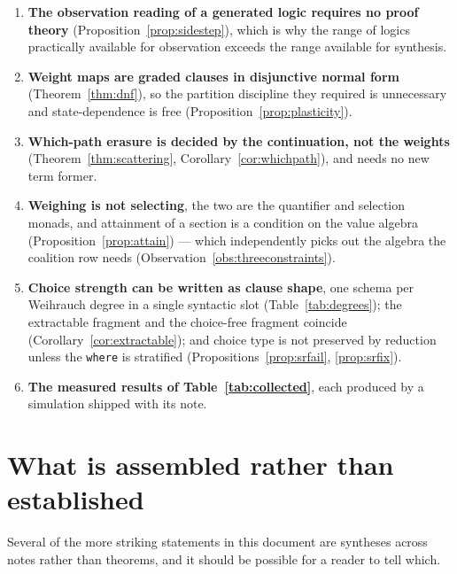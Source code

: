 \begin{enumerate}[leftmargin=2em]
\item \textbf{The observation reading of a generated logic requires no proof
theory} (Proposition~\ref{prop:sidestep}), which is why the range of logics
practically available for observation exceeds the range available for synthesis.

\item \textbf{Weight maps are graded clauses in disjunctive normal form}
(Theorem~\ref{thm:dnf}), so the partition discipline they required is unnecessary
and state-dependence is free (Proposition~\ref{prop:plasticity}).

\item \textbf{Which-path erasure is decided by the continuation, not the weights}
(Theorem~\ref{thm:scattering}, Corollary~\ref{cor:whichpath}), and needs no new
term former.

\item \textbf{Weighing is not selecting}, the two are the quantifier and selection
monads, and attainment of a section is a condition on the value algebra
(Proposition~\ref{prop:attain}) --- which independently picks out the algebra the
coalition row needs (Observation~\ref{obs:threeconstraints}).

\item \textbf{Choice strength can be written as clause shape}, one schema per
Weihrauch degree in a single syntactic slot (Table~\ref{tab:degrees}); the
extractable fragment and the choice-free fragment coincide
(Corollary~\ref{cor:extractable}); and choice type is not preserved by reduction
unless the \texttt{where} is stratified (Propositions~\ref{prop:srfail},
\ref{prop:srfix}).

\item \textbf{The measured results of Table~\ref{tab:collected}}, each produced by
a simulation shipped with its note.
\end{enumerate}

\section{What is assembled rather than established}
\label{sec:assembled}

Several of the more striking statements in this document are syntheses across
notes rather than theorems, and it should be possible for a reader to tell which.

